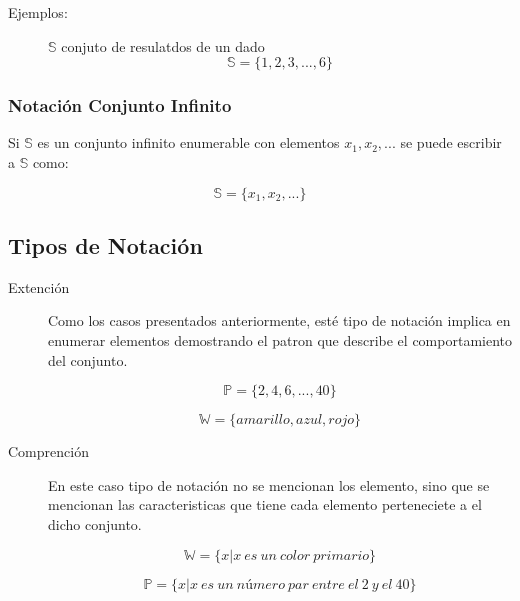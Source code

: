 \documentclass[a4paper,dvipsnames]{book}
\begin{document}
    \begin{description}
        \item[Ejemplos:] $ \mathbb S $ conjuto de resulatdos de un dado
            \begin{equation*}

                \mathbb S=\{1,2,3,...,6\}
            \end{equation*}
    \end{description}

    \subsubsection{Notación Conjunto Infinito}


    Si $ \mathbb S$ es un conjunto infinito enumerable con elementos $
    x_1,x_2,...$ se puede escribir a $ \mathbb S $ como:

    \begin{equation*}

        \mathbb S=\{x_1,x_2,...\}
    \end{equation*}

    \subsection{Tipos de Notación}


    \begin{description}
        \item[Extención] Como los casos presentados anteriormente, esté tipo de
            notación implica en enumerar elementos demostrando el patron que
            describe el comportamiento del conjunto.

            \begin{equation*}

                \mathbb P=\{2,4,6,...,40\}
            \end{equation*}

            \begin{equation*}

                \mathbb W=\{amarillo,azul,rojo\}
            \end{equation*}

        \item[Comprención] En este caso tipo de notación no se mencionan los
            elemento, sino que se mencionan las caracteristicas que tiene cada
            elemento perteneciete a el dicho conjunto.

            \begin{equation*}

                 \mathbb W = \{x|x\ es\ un\ color\ primario\}
            \end{equation*}

            \begin{equation*}

                \mathbb P=\{x|x\ es\ un\ número\ par\ entre\ el\ 2\ y\ el\ 40\}
            \end{equation*}
    \end{description}
\end{document}
